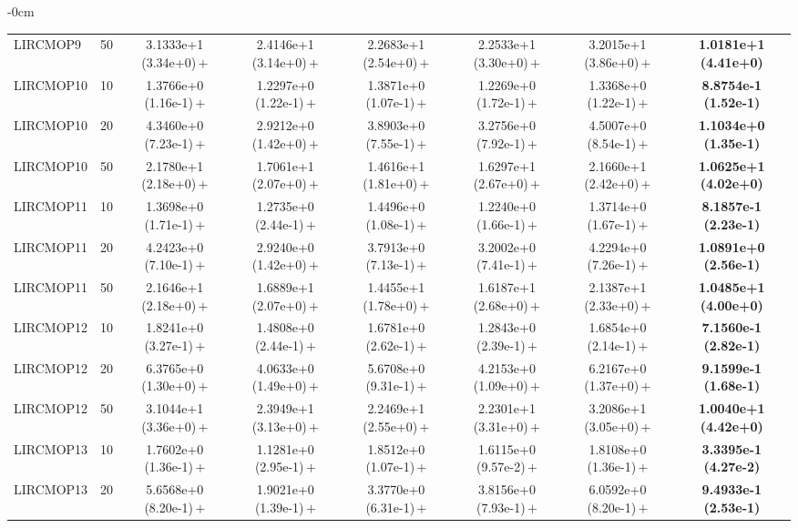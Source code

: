 \begin{table}[!htbp]
\begin{ROneBlock}
\begin{adjustwidth}{-\extralength}{0cm}
\begin{tabular*}{\linewidth}{@{\extracolsep{\fill}}llcccccc@{}}
LIRCMOP9 & 50 & 3.1333e+1 (3.34e+0)\,$+$ & 2.4146e+1 (3.14e+0)\,$+$ & 2.2683e+1 (2.54e+0)\,$+$ & 2.2533e+1 (3.30e+0)\,$+$ & 3.2015e+1 (3.86e+0)\,$+$ & \textbf{1.0181e+1 (4.41e+0)} \\
LIRCMOP10 & 10 & 1.3766e+0 (1.16e-1)\,$+$ & 1.2297e+0 (1.22e-1)\,$+$ & 1.3871e+0 (1.07e-1)\,$+$ & 1.2269e+0 (1.72e-1)\,$+$ & 1.3368e+0 (1.22e-1)\,$+$ & \textbf{8.8754e-1 (1.52e-1)} \\
LIRCMOP10 & 20 & 4.3460e+0 (7.23e-1)\,$+$ & 2.9212e+0 (1.42e+0)\,$+$ & 3.8903e+0 (7.55e-1)\,$+$ & 3.2756e+0 (7.92e-1)\,$+$ & 4.5007e+0 (8.54e-1)\,$+$ & \textbf{1.1034e+0 (1.35e-1)} \\
LIRCMOP10 & 50 & 2.1780e+1 (2.18e+0)\,$+$ & 1.7061e+1 (2.07e+0)\,$+$ & 1.4616e+1 (1.81e+0)\,$+$ & 1.6297e+1 (2.67e+0)\,$+$ & 2.1660e+1 (2.42e+0)\,$+$ & \textbf{1.0625e+1 (4.02e+0)} \\
LIRCMOP11 & 10 & 1.3698e+0 (1.71e-1)\,$+$ & 1.2735e+0 (2.44e-1)\,$+$ & 1.4496e+0 (1.08e-1)\,$+$ & 1.2240e+0 (1.66e-1)\,$+$ & 1.3714e+0 (1.67e-1)\,$+$ & \textbf{8.1857e-1 (2.23e-1)} \\
LIRCMOP11 & 20 & 4.2423e+0 (7.10e-1)\,$+$ & 2.9240e+0 (1.42e+0)\,$+$ & 3.7913e+0 (7.13e-1)\,$+$ & 3.2002e+0 (7.41e-1)\,$+$ & 4.2294e+0 (7.26e-1)\,$+$ & \textbf{1.0891e+0 (2.56e-1)} \\
LIRCMOP11 & 50 & 2.1646e+1 (2.18e+0)\,$+$ & 1.6889e+1 (2.07e+0)\,$+$ & 1.4455e+1 (1.78e+0)\,$+$ & 1.6187e+1 (2.68e+0)\,$+$ & 2.1387e+1 (2.33e+0)\,$+$ & \textbf{1.0485e+1 (4.00e+0)} \\
LIRCMOP12 & 10 & 1.8241e+0 (3.27e-1)\,$+$ & 1.4808e+0 (2.44e-1)\,$+$ & 1.6781e+0 (2.62e-1)\,$+$ & 1.2843e+0 (2.39e-1)\,$+$ & 1.6854e+0 (2.14e-1)\,$+$ & \textbf{7.1560e-1 (2.82e-1)} \\
LIRCMOP12 & 20 & 6.3765e+0 (1.30e+0)\,$+$ & 4.0633e+0 (1.49e+0)\,$+$ & 5.6708e+0 (9.31e-1)\,$+$ & 4.2153e+0 (1.09e+0)\,$+$ & 6.2167e+0 (1.37e+0)\,$+$ & \textbf{9.1599e-1 (1.68e-1)} \\
LIRCMOP12 & 50 & 3.1044e+1 (3.36e+0)\,$+$ & 2.3949e+1 (3.13e+0)\,$+$ & 2.2469e+1 (2.55e+0)\,$+$ & 2.2301e+1 (3.31e+0)\,$+$ & 3.2086e+1 (3.05e+0)\,$+$ & \textbf{1.0040e+1 (4.42e+0)} \\
LIRCMOP13 & 10 & 1.7602e+0 (1.36e-1)\,$+$ & 1.1281e+0 (2.95e-1)\,$+$ & 1.8512e+0 (1.07e-1)\,$+$ & 1.6115e+0 (9.57e-2)\,$+$ & 1.8108e+0 (1.36e-1)\,$+$ & \textbf{3.3395e-1 (4.27e-2)} \\
LIRCMOP13 & 20 & 5.6568e+0 (8.20e-1)\,$+$ & 1.9021e+0 (1.39e-1)\,$+$ & 3.3770e+0 (6.31e-1)\,$+$ & 3.8156e+0 (7.93e-1)\,$+$ & 6.0592e+0 (8.20e-1)\,$+$ & \textbf{9.4933e-1 (2.53e-1)} \\

\end{tabular*}
\end{adjustwidth}
\end{ROneBlock}
\end{table}
